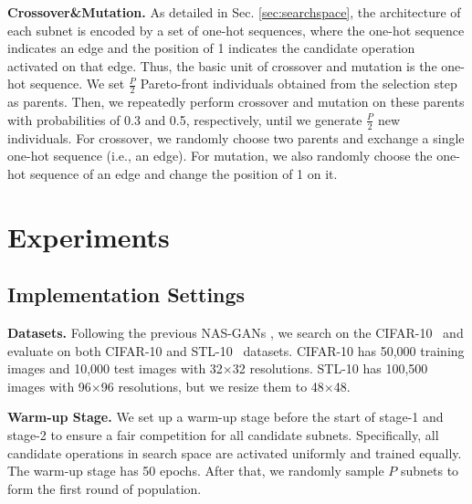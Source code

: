 \documentclass[runningheads]{llncs}
\begin{document}
\textbf{Crossover\&Mutation.} As detailed in Sec. \ref{sec:searchspace}, the architecture of each subnet is encoded by a set of one-hot sequences, where the one-hot sequence indicates an edge and the position of 1 indicates the candidate operation activated on that edge. Thus, the basic unit of crossover and mutation is the one-hot sequence. We set $\frac{P}{2}$ Pareto-front individuals obtained from the selection step as parents. Then, we repeatedly perform crossover and mutation on these parents with probabilities of 0.3 and 0.5, respectively, until we generate $\frac{P}{2}$ new individuals. For crossover, we randomly choose two parents and exchange a single one-hot sequence (i.e., an edge). For mutation, we also randomly choose the one-hot sequence of an edge and change the position of 1 on it.













\section{Experiments}











\subsection{Implementation Settings}











\textbf{Datasets.} Following the previous NAS-GANs \cite{autoGAN,Adversarialnas,EGAN}, we search on the CIFAR-10~\cite{cifar10} and evaluate on both CIFAR-10 and STL-10~\cite{stl10} datasets. CIFAR-10 has 50,000 training images and 10,000 test images with 32$\times$32 resolutions. STL-10 has 100,500 images with 96$\times$96 resolutions, but we resize them to 48$\times$48.

\textbf{Warm-up Stage.} We set up a warm-up stage before the start of stage-1 and stage-2 to ensure a fair competition for all candidate subnets. Specifically, all candidate operations in search space are activated uniformly and trained equally. The warm-up stage has 50 epochs. After that, we randomly sample $P$ subnets to form the first round of population.
\end{document}
